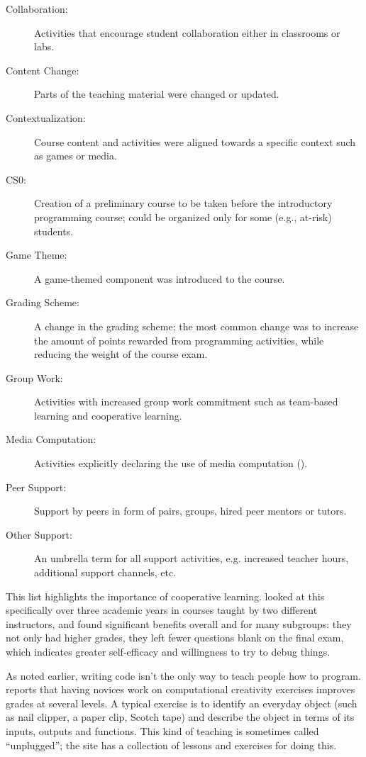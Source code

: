 \begin{description}
\item[Collaboration:]
Activities that encourage student collaboration either in classrooms
or labs.
\item[Content Change:]
Parts of the teaching material were changed or updated.
\item[Contextualization:]
Course content and activities were aligned towards a specific
context such as games or media.
\item[CS0:]
Creation of a preliminary course to be taken before the introductory
programming course; could be organized only for some (e.g., at-risk)
students.
\item[Game Theme:]
A game-themed component was introduced to the course.
\item[Grading Scheme:]
A change in the grading scheme; the most common change was to
increase the amount of points rewarded from programming activities,
while reducing the weight of the course exam.
\item[Group Work:]
Activities with increased group work commitment such as team-based
learning and cooperative learning.
\item[Media Computation:]
Activities explicitly declaring the use of media computation
().
\item[Peer Support:]
Support by peers in form of pairs, groups, hired peer mentors or
tutors.
\item[Other Support:]
An umbrella term for all support activities, e.g. increased teacher
hours, additional support channels, etc.
\end{description}


This list highlights the importance of cooperative learning.
\cite{Beck2013} looked at this specifically over three academic years
in courses taught by two different instructors, and found significant
benefits overall and for many subgroups: they not only had higher
grades, they left fewer questions blank on the final exam, which
indicates greater self-efficacy and willingness to try to debug things.

As noted earlier, writing code isn't the only way to teach people how
to program. \cite{Shel2017} reports that having novices work on
computational creativity exercises improves grades at several
levels. A typical exercise is to identify an everyday object (such as
nail clipper, a paper clip, Scotch tape) and describe the object in
terms of its inputs, outputs and functions. This kind of teaching is
sometimes called ``unplugged''; the  site
has a collection of lessons and exercises for doing this.

